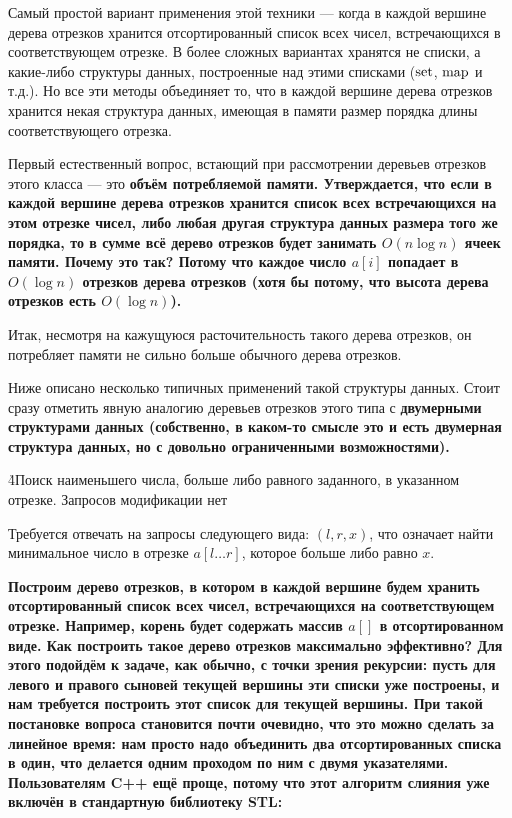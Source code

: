 Самый простой вариант применения этой техники --- когда в каждой вершине дерева отрезков хранится отсортированный список всех чисел, встречающихся в соответствующем отрезке. В более сложных вариантах хранятся не списки, а какие-либо структуры данных, построенные над этими списками ($\rm set$, $\rm map$ и т.д.). Но все эти методы объединяет то, что в каждой вершине дерева отрезков хранится некая структура данных, имеющая в памяти размер порядка длины соответствующего отрезка.

Первый естественный вопрос, встающий при рассмотрении деревьев отрезков этого класса --- это \bf{объём потребляемой памяти}. Утверждается, что если в каждой вершине дерева отрезков хранится список всех встречающихся на этом отрезке чисел, либо любая другая структура данных размера того же порядка, то в сумме всё дерево отрезков будет занимать $O (n \log n)$ ячеек памяти. Почему это так? Потому что каждое число $a[i]$ попадает в $O (\log n)$ отрезков дерева отрезков (хотя бы потому, что высота дерева отрезков есть $O (\log n)$).

Итак, несмотря на кажущуюся расточительность такого дерева отрезков, он потребляет памяти не сильно больше обычного дерева отрезков.

Ниже описано несколько типичных применений такой структуры данных. Стоит сразу отметить явную аналогию деревьев отрезков этого типа с \bf{двумерными структурами данных} (собственно, в каком-то смысле это и есть двумерная структура данных, но с довольно ограниченными возможностями).

\h4{Поиск наименьшего числа, больше либо равного заданного, в указанном отрезке. Запросов модификации нет}

Требуется отвечать на запросы следующего вида: $(l,r,x)$, что означает найти минимальное число в отрезке $a[l \ldots r]$, которое больше либо равно $x$.

\bf{Построим} дерево отрезков, в котором в каждой вершине будем хранить отсортированный список всех чисел, встречающихся на соответствующем отрезке. Например, корень будет содержать массив $a[]$ в отсортированном виде. Как построить такое дерево отрезков максимально эффективно? Для этого подойдём к задаче, как обычно, с точки зрения рекурсии: пусть для левого и правого сыновей текущей вершины эти списки уже построены, и нам требуется построить этот список для текущей вершины. При такой постановке вопроса становится почти очевидно, что это можно сделать за линейное время: нам просто надо объединить два отсортированных списка в один, что делается одним проходом по ним с двумя указателями. Пользователям C++ ещё проще, потому что этот алгоритм слияния уже включён в стандартную библиотеку STL:

